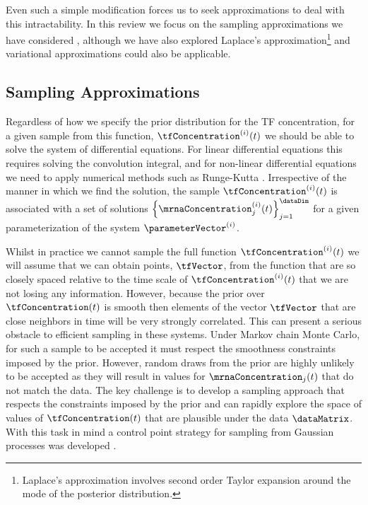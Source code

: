 \documentclass{article}
\begin{document}
Even such a simple modification forces us to seek approximations to
deal with this intractability. In this review we focus on the sampling
approximations we have considered
\citep{Titsias:efficient08,Titsias:timeseries10}, although we have
also explored Laplace's approximation\footnote{Laplace's approximation
  involves second order Taylor expansion around the mode of the
  posterior distribution.}
\citep[see]{Lawrence:transcriptionalGP06,Gao:latent08,Lawrence:licsbgp10}
and variational approximations could also be applicable.

\subsection{Sampling Approximations}

Regardless of how we specify the prior distribution for the TF
concentration, for a given sample from this function,
$\tfConcentration^{(i)}(t)$ we should be able to solve the system of
differential equations. For linear differential equations this
requires solving the convolution integral, and for non-linear
differential equations we need to apply numerical methods such as
Runge-Kutta \citep{}. Irrespective of the manner in which we find the
solution, the sample $\tfConcentration^{(i)}(t)$ is associated with a
set of solutions
$\left\{\mrnaConcentration_j^{(i)}(t)\right\}_{j=1}^\dataDim$ for a
given parameterization of the system $\parameterVector^{(i)}$.

Whilst in practice we cannot sample the full function
$\tfConcentration^{(i)}(t)$ we will assume that we can obtain points,
$\tfVector$, from the function that are so closely spaced relative to
the time scale of $\tfConcentration^{(i)}(t)$ that we are not losing
any information. However, because the prior over $\tfConcentration(t)$
is smooth then elements of the vector $\tfVector$ that are close neighbors in
time will be very strongly correlated. This can present a serious
obstacle to efficient sampling in these systems. Under Markov chain
Monte Carlo, for such a sample to be accepted it must respect the
smoothness constraints imposed by the prior. However, random draws
from the prior are highly unlikely to be accepted as they will result
in values for $\mrnaConcentration_j(t)$ that do not match the
data. The key challenge is to develop a sampling approach that
respects the constraints imposed by the prior and can rapidly explore
the space of values of $\tfConcentration(t)$ that are plausible under
the data $\dataMatrix$. With this task in mind a control point
strategy for sampling from Gaussian processes was developed
\citep{Titsias:efficient08,Titsias:timeseries10}.
\end{document}
